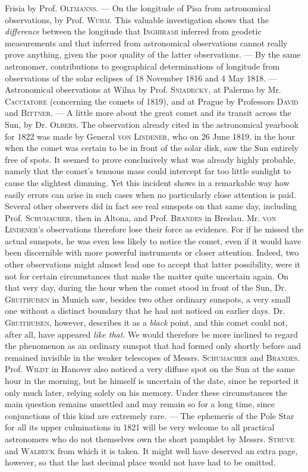 Frisia by Prof. \textsc{Oltmanns}. --- On the longitude of Pisa from astronomical observations, by Prof. \textsc{Wurm}. This valuable investigation shows that the \emph{difference} between the longitude that \textsc{Inghirami} inferred from geodetic measurements and that inferred from astronomical observations cannot really prove anything, given the poor quality of the latter observations. --- By the same astronomer, contributions to geographical determinations of longitude from observations of the solar eclipses of 18 November 1816 and 4 May 1818. --- Astronomical observations at Wilna by Prof. \textsc{Sniadecky}, at Palermo by Mr. \textsc{Cacciatore} (concerning the comets of 1819), and at Prague by Professors \textsc{David} and \textsc{Bittner}. --- A little more about the great comet and its transit across the Sun, by Dr. \textsc{Olbers}. The observation already cited in the astronomical yearbook for 1822 was made by General \textsc{von Lindener}, who on 26 June 1819, in the hour when the comet was certain to be in front of the solar disk, saw the Sun entirely free of spots. It seemed to prove conclusively what was already highly probable, namely that the comet's tenuous mass could intercept far too little sunlight to cause the slightest dimming. Yet this incident shows in a remarkable way how easily errors can arise in such cases when no particularly close attention is paid. Several other observers did in fact see real sunspots on that same day, including Prof. \textsc{Schumacher}, then in Altona, and Prof. \textsc{Brandes} in Breslau. Mr. \textsc{von Lindener}'s observations therefore lose their force as evidence. For if he missed the actual sunspots, he was even less likely to notice the comet, even if it would have been discernible with more powerful instruments or closer attention. Indeed, two other observations might almost lead one to accept that latter possibility, were it not for certain circumstances that make the matter quite uncertain again. On that very day, during the hour when the comet stood in front of the Sun, Dr. \textsc{Gruithuisen} in Munich saw, besides two other ordinary sunspots, a very small one without a distinct boundary that he had not noticed on  earlier days. Dr. \textsc{Gruithuisen}, however, describes it as a \emph{black} point, and this comet could not, after all, have appeared \emph{like that}. We would therefore be more inclined to regard the phenomenon as an ordinary sunspot that had formed only shortly before and remained invisible in the weaker telescopes of Messrs. \textsc{Schumacher} and \textsc{Brandes}. Prof. \textsc{Wildt} in Hanover also noticed a very diffuse spot on the Sun at the same hour in the morning, but he himself is uncertain of the date, since he reported it only much later, relying solely on his memory. Under these circumstances the main question remains unsettled and may remain so for a long time, since conjunctions of this kind are extremely rare. --- The ephemeris of the Pole Star for all its upper culminations in 1821 will be very welcome to all practical astronomers who do not themselves own the short pamphlet by Messrs. \textsc{Struve} and \textsc{Walbeck} from which it is taken. It might well have deserved an extra page, however, so that the last decimal place would not have had to be omitted. 